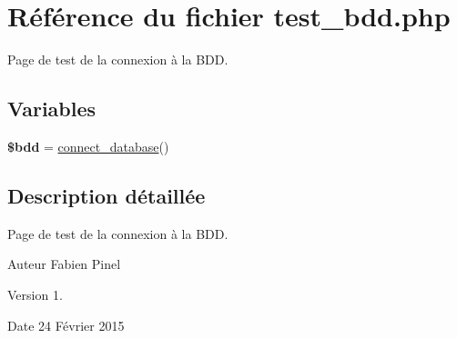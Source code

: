 \hypertarget{test__bdd_8php}{\section{Référence du fichier test\-\_\-bdd.\-php}
\label{test__bdd_8php}
}


Page de test de la connexion à la B\-D\-D.  


\subsection*{Variables}
\begin{DoxyCompactItemize}
\item 
\hypertarget{test__bdd_8php_a94f91e878bce0991e2cd595c5dd79b3f}{{\bfseries \$bdd} = \hyperlink{function_8php_a1f56f7efe8c1222675d8715c259957d5}{connect\-\_\-database}()}\label{test__bdd_8php_a94f91e878bce0991e2cd595c5dd79b3f}

\end{DoxyCompactItemize}


\subsection{Description détaillée}
Page de test de la connexion à la B\-D\-D. \begin{DoxyAuthor}{Auteur}
Fabien Pinel 
\end{DoxyAuthor}
\begin{DoxyVersion}{Version}
1. 
\end{DoxyVersion}
\begin{DoxyDate}{Date}
24 Février 2015 
\end{DoxyDate}
